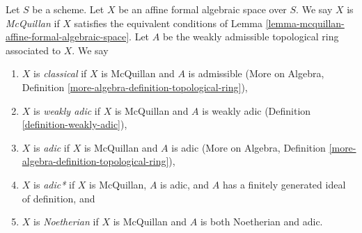 \begin{definition}
\label{definition-types-affine-formal-algebraic-space}
Let $S$ be a scheme. Let $X$ be an affine formal algebraic space over $S$.
We say $X$ is {\it McQuillan} if $X$ satisfies the equivalent conditions
of Lemma \ref{lemma-mcquillan-affine-formal-algebraic-space}. Let $A$
be the weakly admissible topological ring associated to $X$. We say
\begin{enumerate}
\item $X$ is {\it classical} if $X$ is McQuillan and $A$ is admissible
(More on Algebra, Definition \ref{more-algebra-definition-topological-ring}),
\item $X$ is {\it weakly adic} if $X$ is McQuillan and $A$ is weakly adic
(Definition \ref{definition-weakly-adic}),
\item $X$ is {\it adic} if $X$ is McQuillan and $A$ is adic
(More on Algebra, Definition \ref{more-algebra-definition-topological-ring}),
\item $X$ is {\it adic*} if $X$ is McQuillan, $A$ is adic, and $A$
has a finitely generated ideal of definition, and
\item $X$ is {\it Noetherian} if $X$ is McQuillan and $A$ is
both Noetherian and adic.
\end{enumerate}
\end{definition}